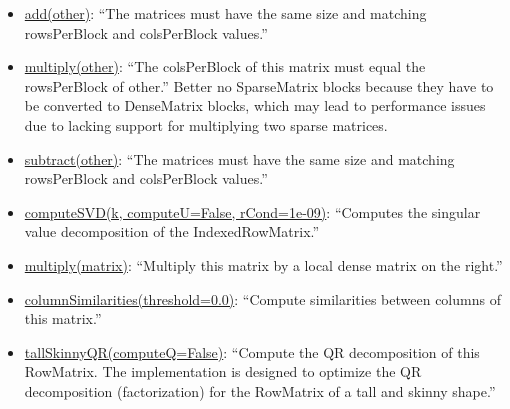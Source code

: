 \documentclass{prog_report}
\begin{document}
\begin{itemize}
    \item
    \href{https://spark.apache.org/docs/2.4.3/api/python/pyspark.mllib.html\#pyspark.mllib.linalg.distributed.BlockMatrix.add}{add(other)}:
    ``The matrices must have the same size and matching rowsPerBlock and
    colsPerBlock values.''
    \item
    \href{https://spark.apache.org/docs/2.4.3/api/python/pyspark.mllib.html\#pyspark.mllib.linalg.distributed.BlockMatrix.multiply}{multiply(other)}:
    ``The colsPerBlock of this matrix must equal the rowsPerBlock of
    other.'' Better no SparseMatrix blocks because they have to be
    converted to DenseMatrix blocks, which may lead to performance
    issues due to lacking support for multiplying two sparse matrices.
    \item
    \href{https://spark.apache.org/docs/2.4.3/api/python/pyspark.mllib.html\#pyspark.mllib.linalg.distributed.BlockMatrix.subtract}{subtract(other)}:
    ``The matrices must have the same size and matching rowsPerBlock and
    colsPerBlock values.''
    \item
    \href{https://spark.apache.org/docs/2.4.3/api/python/pyspark.mllib.html\#pyspark.mllib.linalg.distributed.IndexedRowMatrix.computeSVD}{computeSVD(k,
        computeU=False, rCond=1e-09)}: ``Computes the singular value
    decomposition of the IndexedRowMatrix.''
    \item
    \href{https://spark.apache.org/docs/2.4.3/api/python/pyspark.mllib.html\#pyspark.mllib.linalg.distributed.IndexedRowMatrix.multiply}{multiply(matrix)}:
    ``Multiply this matrix by a local dense matrix on the right.''
    \item
    \href{https://spark.apache.org/docs/2.4.3/api/python/pyspark.mllib.html\#pyspark.mllib.linalg.distributed.RowMatrix.columnSimilarities}{columnSimilarities(threshold=0.0)}:
    ``Compute similarities between columns of this matrix.''
    \item
    \href{https://spark.apache.org/docs/2.4.3/api/python/pyspark.mllib.html\#pyspark.mllib.linalg.distributed.RowMatrix.tallSkinnyQR}{tallSkinnyQR(computeQ=False)}:
    ``Compute the QR decomposition of this RowMatrix. The implementation
    is designed to optimize the QR decomposition (factorization) for the
    RowMatrix of a tall and skinny shape.''
\end{itemize}
\end{document}
